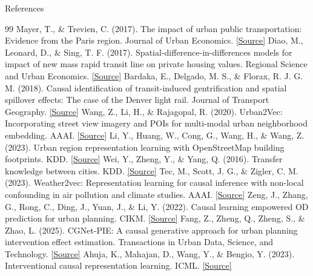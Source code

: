 \documentclass[aspectratio=169,11pt]{beamer}
\begin{document}
\begin{frame}[allowframebreaks]{References}
\begin{thebibliography}{99}
     Mayer, T., \& Trevien, C. (2017). The impact of urban public transportation: Evidence from the Paris region. Journal of Urban Economics. \href{https://doi.org/10.1016/j.jue.2017.07.003}{[Source]}
     Diao, M., Leonard, D., \& Sing, T. F. (2017). Spatial-difference-in-differences models for impact of new mass rapid transit line on private housing values. Regional Science and Urban Economics. \href{https://doi.org/10.1016/j.regsciurbeco.2017.08.006}{[Source]}
     Bardaka, E., Delgado, M. S., \& Florax, R. J. G. M. (2018). Causal identification of transit-induced gentrification and spatial spillover effects: The case of the Denver light rail. Journal of Transport Geography. \href{https://doi.org/10.1016/j.jtrangeo.2018.06.025}{[Source]}
     Wang, Z., Li, H., \& Rajagopal, R. (2020). Urban2Vec: Incorporating street view imagery and POIs for multi-modal urban neighborhood embedding. AAAI. \href{https://ojs.aaai.org/index.php/AAAI/article/view/5450}{[Source]}
     Li, Y., Huang, W., Cong, G., Wang, H., \& Wang, Z. (2023). Urban region representation learning with OpenStreetMap building footprints. KDD. \href{https://doi.org/10.1145/3580305.3599538}{[Source]}
     Wei, Y., Zheng, Y., \& Yang, Q. (2016). Transfer knowledge between cities. KDD. \href{https://doi.org/10.1145/2939672.2939830}{[Source]}
     Tec, M., Scott, J. G., \& Zigler, C. M. (2023). Weather2vec: Representation learning for causal inference with non-local confounding in air pollution and climate studies. AAAI. \href{https://ojs.aaai.org/index.php/AAAI/article/view/26696}{[Source]}
     Zeng, J., Zhang, G., Rong, C., Ding, J., Yuan, J., \& Li, Y. (2022). Causal learning empowered OD prediction for urban planning. CIKM. \href{https://doi.org/10.1145/3511808.3557255}{[Source]}
     Fang, Z., Zheng, Q., Zheng, S., \& Zhao, L. (2025). CGNet-PIE: A causal generative approach for urban planning intervention effect estimation. Transactions in Urban Data, Science, and Technology. \href{https://doi.org/10.1177/27541231251318348}{[Source]}
     Ahuja, K., Mahajan, D., Wang, Y., \& Bengio, Y. (2023). Interventional causal representation learning. ICML. \href{https://proceedings.mlr.press/v202/ahuja23a.html}{[Source]}
  \end{thebibliography}
\end{frame}
\end{document}
